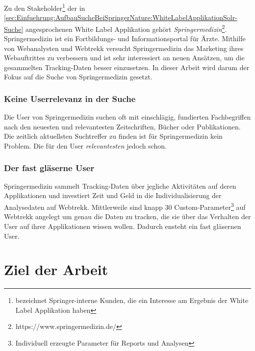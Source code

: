 Zu den Stakeholder\footnote{bezeichnet Springer-interne Kunden, die ein Interesse am Ergebnis der White Label Applikation haben} der in \ref{sec:Einfuehrung:AufbauSucheBeiSpringerNature:WhiteLabelApplikationSolr-Suche} angesprochenen White Label Applikation gehört \textit{Springermedizin}\footnote{https://www.springermedizin.de/}. Springermedizin ist ein Fortbildungs- und Informationsportal für Ärzte. Mithilfe von Webanalysten und Webtrekk versucht Springermedizin das Marketing ihres Webauftrittes zu verbessern und ist sehr interessiert an neuen Ansätzen, um die gesammelten Tracking-Daten besser einzusetzen. In dieser Arbeit wird darum der Fokus auf die Suche von Springermedizin gesetzt. 

\subsubsection{Keine Userrelevanz in der Suche}
\label{sec:Einfuehrung:Problemstellung:Userrelevanz}

Die User von Springermedizin suchen oft mit einschlägig, fundierten Fachbegriffen nach den neuesten und relevantesten Zeitschriften, Bücher oder Publikationen. Die zeitlich aktuellsten Suchtreffer zu finden ist für Springermedizin kein Problem. Die für den User \textit{relevantesten} jedoch schon. 

\subsubsection{Der fast gläserne User}
\label{sec:Einfuehrung:Problemstellung:Glaeserne-User}

Springermedizin sammelt Tracking-Daten über jegliche Aktivitäten auf deren Applikationen und investiert Zeit und Geld in die Individualisierung der Analysedaten auf Webtrekk. Mittlerweile sind knapp 30 Custom-Parameter\footnote{Individuell erzeugte Parameter für Reports und Analysen} auf Webtrekk angelegt um genau die Daten zu tracken, die sie über das Verhalten der User auf ihrer Applikationen wissen wollen. Dadurch ensteht ein fast \glqq gläsernen User\grqq{}.

\section{Ziel der Arbeit}
\label{sec:Einfuehrung:ZielArbeit}

